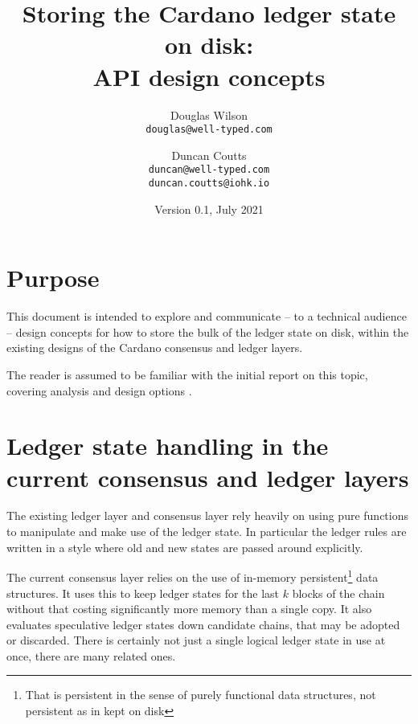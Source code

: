 \documentclass[11pt,a4paper]{article}
\begin{document}
\title{Storing the Cardano ledger state on disk: \\
       API design concepts
  }
\date{Version 0.1, July 2021}
\author{Douglas Wilson     \\ {\small \texttt{douglas@well-typed.com}} \\
   \and Duncan Coutts      \\ {\small \texttt{duncan@well-typed.com}} \\
                              {\small \texttt{duncan.coutts@iohk.io}}
   }

\maketitle

\section{Purpose}

This document is intended to explore and communicate -- to a technical audience
-- design concepts for how to store the bulk of the ledger state on disk, within
the existing designs of the Cardano consensus and ledger layers.

The reader is assumed to be familiar with the initial report on this topic,
covering analysis and design options \citep{utxo-db}.

\tableofcontents

\section{Ledger state handling in the current consensus and ledger layers}

The existing ledger layer and consensus layer rely heavily on using pure
functions to manipulate and make use of the ledger state. In particular the
ledger rules are written in a style where old and new states are passed around
explicitly.

The current consensus layer relies on the use of in-memory
persistent\footnote{That is persistent in the sense of purely functional data
structures, not persistent as in kept on disk} data structures. It uses this
to keep ledger states for the last $k$ blocks of the chain without that costing
significantly more memory than a single copy. It also evaluates speculative
ledger states down candidate chains, that may be adopted or discarded. There is
certainly not just a single logical ledger state in use at once, there are many
related ones.
\end{document}
